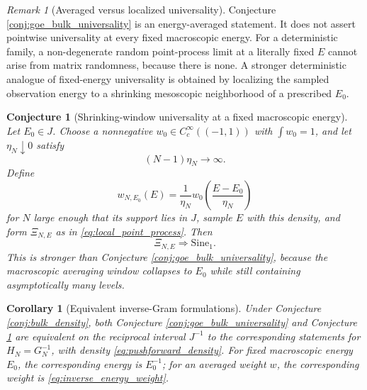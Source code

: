 \documentclass[11pt]{amsart}
\numberwithin{equation}{section}
\theoremstyle{plain}
\newtheorem{corollary}[theorem]{Corollary}
\newtheorem{conjecture}[theorem]{Conjecture}
\theoremstyle{definition}
\theoremstyle{remark}
\newtheorem{remark}[theorem]{Remark}
\begin{document}
\begin{remark}[Averaged versus localized universality]
\label{rem:averaged_vs_fixed_energy}
Conjecture \ref{conj:goe_bulk_universality} is an energy-averaged statement.  It does not assert pointwise universality at every fixed macroscopic energy.  For a deterministic family, a non-degenerate random point-process limit at a literally fixed $E$ cannot arise from matrix randomness, because there is none.  A stronger deterministic analogue of fixed-energy universality is obtained by localizing the sampled observation energy to a shrinking mesoscopic neighborhood of a prescribed $E_0$.
\end{remark}

\begin{conjecture}[Shrinking-window universality at a fixed macroscopic energy]
\label{conj:fixed_energy_goe}
Let $E_0\in J$.  Choose a nonnegative $w_0\in C_c^\infty((-1,1))$ with $\int w_0=1$, and let $\eta_N\downarrow0$ satisfy
\begin{equation}
(N-1)\eta_N\longrightarrow\infty.
\label{eq:mesoscopic_window_condition}
\end{equation}
Define
\begin{equation}
w_{N,E_0}(E)=\frac1{\eta_N}w_0\!\left(\frac{E-E_0}{\eta_N}\right)
\end{equation}
for $N$ large enough that its support lies in $J$, sample $E$ with this density, and form $\Xi_{N,E}$ as in \eqref{eq:local_point_process}.  Then
\begin{equation}
\Xi_{N,E}\Longrightarrow \mathrm{Sine}_1.
\label{eq:fixed_energy_sine1}
\end{equation}
This is stronger than Conjecture \ref{conj:goe_bulk_universality}, because the macroscopic averaging window collapses to $E_0$ while still containing asymptotically many levels.
\end{conjecture}

\begin{corollary}[Equivalent inverse-Gram formulations]
\label{cor:inverse_goe_equivalence}
Under Conjecture \ref{conj:bulk_density}, both Conjecture \ref{conj:goe_bulk_universality} and Conjecture \ref{conj:fixed_energy_goe} are equivalent on the reciprocal interval $J^{-1}$ to the corresponding statements for $H_N=G_N^{-1}$, with density \eqref{eq:pushforward_density}.  For fixed macroscopic energy $E_0$, the corresponding energy is $E_0^{-1}$; for an averaged weight $w$, the corresponding weight is \eqref{eq:inverse_energy_weight}.
\end{corollary}
\end{document}
